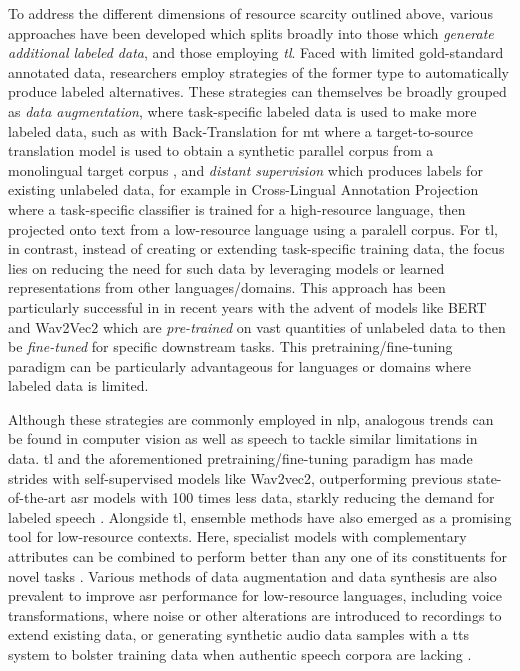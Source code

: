 \documentclass[thesis]{cluu}
\begin{document}
To address the different dimensions of resource scarcity outlined above, various approaches have been developed which \textcite{hedderichSurveyRecentApproaches2021} splits broadly into those which \textit{generate additional labeled data}, and those employing \textit{\gls{tl}}. Faced with limited gold-standard annotated data, researchers employ strategies of the former type to automatically produce labeled alternatives. These strategies can themselves be broadly grouped as \textit{data augmentation}, where task-specific labeled data is used to make more labeled data, such as with Back-Translation for \gls{mt} where a target-to-source translation model is used to obtain a synthetic parallel corpus from a monolingual target corpus \parencite{ranathungaNeuralMachineTranslation2021}, and \textit{distant supervision} which produces labels for existing unlabeled data, for example in Cross-Lingual Annotation Projection where a task-specific classifier is trained for a high-resource language, then projected onto text from a low-resource language using a paralell corpus. For \gls{tl}, in contrast, instead of creating or extending task-specific training data, the focus lies on reducing the need for such data by leveraging models or learned representations from other languages/domains. This approach has been particularly successful in in recent years with the advent of models like BERT \parencite{devlinBERTPretrainingDeep2019} and Wav2Vec2 \parencite{baevskiWav2vec20Framework2020} which are \textit{pre-trained} on vast quantities of unlabeled data to then be \textit{fine-tuned} for specific downstream tasks. This pretraining/fine-tuning paradigm can be particularly advantageous for languages or domains where labeled data is limited.

Although these strategies are commonly employed in \gls{nlp}, analogous trends can be found in computer vision as well as speech to tackle similar limitations in data. \gls{tl} and the aforementioned pretraining/fine-tuning paradigm has made strides with self-supervised models like Wav2vec2, outperforming previous state-of-the-art \gls{asr} models with 100 times less data, starkly reducing the demand for labeled speech \parencite{baevskiWav2vec20Framework2020}. Alongside \gls{tl}, ensemble methods have also emerged as a promising tool for low-resource contexts. Here, specialist models with complementary attributes can be combined to perform better than any one of its constituents for novel tasks \parencite[inter alia]{arunkumarInvestigationEnsembleFeatures2022,dengEnsembleDeepLearning2014,gitmanConfidencebasedEnsemblesEndtoEnd2023,fiscus1997post}. Various methods of data augmentation and data synthesis are also prevalent to improve \gls{asr} performance for low-resource languages, including voice transformations, where noise or other alterations are introduced to recordings to extend existing data, or generating synthetic audio data samples with a \gls{tts} system to bolster training data when authentic speech corpora are lacking \parencite{barteldsMakingMoreLittle2023,zhangL2GENNeuralPhoneme2022}.
\end{document}
